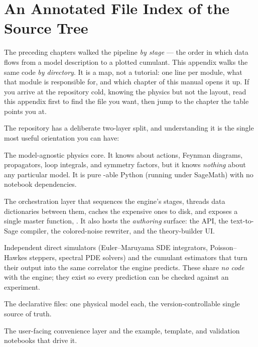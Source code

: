 \chapter{An Annotated File Index of the Source Tree}\label{app:file-index}

The preceding chapters walked the pipeline \emph{by stage} --- the
order in which data flows from a model description to a plotted cumulant.
This appendix walks the same code \emph{by directory}. It is a map, not a
tutorial: one line per module, what that module is responsible for, and
which chapter of this manual opens it up. If you arrive at the repository
cold, knowing the physics but not the layout, read this appendix first to
find the file you want, then jump to the chapter the table points you at.

The repository has a deliberate two-layer split, and understanding it is
the single most useful orientation you can have:

\begin{description}[style=nextline,leftmargin=1.4em]
  \item[\file{msrjd/} --- the engine.] The model-agnostic physics core. It
        knows about \msrjd{} actions, Feynman diagrams, propagators, loop
        integrals, and symmetry factors, but it knows \emph{nothing} about
        any particular model. It is pure -able Python (running
        under SageMath) with no notebook dependencies.
  \item[\file{pipeline/} --- the driver.] The orchestration layer that
        sequences the engine's stages, threads data dictionaries between
        them, caches the expensive ones to disk, and exposes a single
        master function, . It also hosts the
        \emph{authoring} surface: the  API, the
        text-to-Sage compiler, the colored-noise rewriter, and the
         theory-builder UI.
  \item[\file{models/} --- the validators.] Independent direct simulators
        (Euler--Maruyama SDE integrators, Poisson--Hawkes steppers,
        spectral PDE solvers) and the cumulant estimators that turn their
        output into the same correlator the engine predicts. These share
        \emph{no code} with the engine; they exist so every prediction can
        be checked against an experiment.
  \item[\file{theories/} --- the models.] The declarative
         files: one physical model each, the
        version-controllable single source of truth.
  \item[\file{notebooks/} --- the front desk.] The user-facing convenience
        layer  and the example, template, and validation
        notebooks that drive it.
\end{description}

